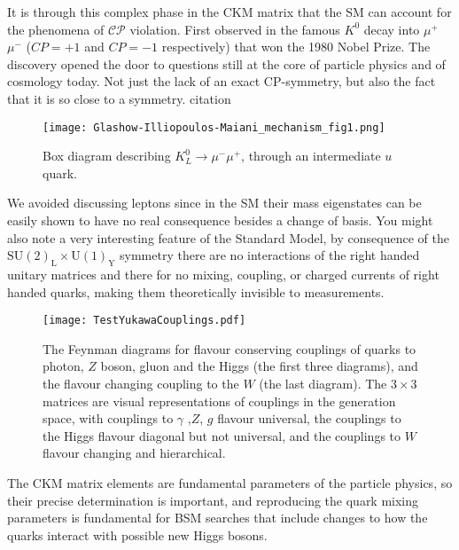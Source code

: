 It is through this complex phase in the CKM matrix that the SM can account for the phenomena of $\mathcal{CP}$ violation. First observed in the famous $K^0$ decay into $\mu^+$ $\mu^-$ ($CP=+1$ and $CP=-1$ respectively) that won the 1980 Nobel Prize. The discovery opened the door to questions still at the core of particle physics and of cosmology today. Not just the lack of an exact CP-symmetry, but also the fact that it is so close to a symmetry. {\color{blue} citation}

\begin{figure}[H]
	\centering
	\texttt{[image: Glashow-Illiopoulos-Maiani\_mechanism\_fig1.png]}
	\caption{Box diagram describing $K_L^0\rightarrow\mu^-\mu^+$, through an intermediate $u$ quark.}
	\label{fig:Kaon}
\end{figure}

We avoided discussing leptons since in the SM their mass eigenstates can be easily shown to have no real consequence besides a change of basis. 
%
You might also note a very interesting feature of the Standard Model, by consequence of the $\mathrm{SU(2)_L \times U(1)_Y }$ symmetry there are no interactions of the right handed unitary matrices and there for no mixing, coupling, or charged currents of right handed quarks, making them theoretically invisible to measurements.  
%
\begin{figure}[H]
	\centering
	\texttt{[image: TestYukawaCouplings.pdf]}
	\caption{The Feynman diagrams for flavour conserving couplings of quarks to photon, $Z$ boson, gluon and the Higgs (the first three diagrams), and the flavour changing coupling to the $W$ (the last diagram). The $3\times3$ matrices are visual representations of couplings in the generation space, with couplings to $\gamma$ ,$Z$, $g$ flavour universal, the couplings to the Higgs flavour diagonal but not universal, and the couplings to $W$ flavour changing and hierarchical.}
	\label{fig:QuarkCKM}
\end{figure}
%

%

The CKM matrix elements are fundamental parameters of the particle physics, so their precise determination is important, and reproducing the quark mixing parameters is fundamental for BSM searches that include changes to how the quarks interact with possible new Higgs bosons. 
